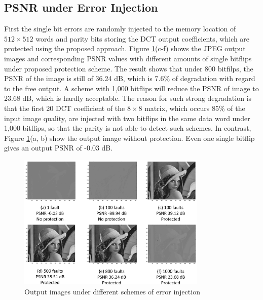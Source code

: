 % 

\subsection{PSNR under Error Injection}

First the single bit errors are randomly injected to the memory location of $512 \times 512$ words and parity bits storing the DCT output coefficients, which are protected using the proposed approach. Figure \ref{fig:qos_lena}(c-f) shows the JPEG output images and corresponding PSNR values with different amounts of single bitflips under proposed protection scheme. The result shows that under 800 bitfilps, the PSNR of the image is still of 36.24 dB, which is 7.6\% of degradation with regard to the  free output. A scheme with 1,000 bitflips will reduce the PSNR of image to 23.68 dB, which is hardly acceptable. The reason for such strong degradation is that the first 20 DCT coefficient of the $8 \times 8$ matrix, which occurs 85\% of the input image quality, are injected with two bitflips in the same data word under 1,000 bitflips, so that the parity is not able to detect such schemes. In contrast, Figure  \ref{fig:qos_lena}(a, b) show the output image without protection. Even one single bitflip gives an output PSNR of -0.03 dB.

\begin{figure}
\centering
\includegraphics[width=90mm]{./eps/qos_lena}
\caption{Output images under different schemes of error injection}
\vspace{-4mm}
\label{fig:qos_lena}
\end{figure}

